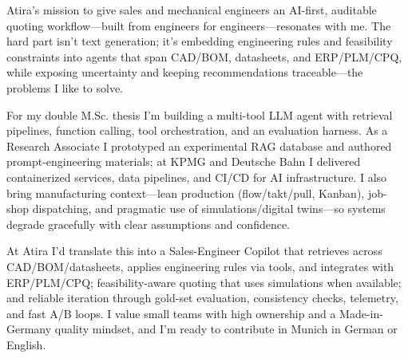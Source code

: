 Atira’s mission to give sales and mechanical engineers an AI-first, auditable quoting workflow—built from engineers for engineers—resonates with me. The hard part isn’t text generation; it’s embedding engineering rules and feasibility constraints into agents that span CAD/BOM, datasheets, and ERP/PLM/CPQ, while exposing uncertainty and keeping recommendations traceable—the problems I like to solve.

For my double M.Sc. thesis I’m building a multi-tool LLM agent with retrieval pipelines, function calling, tool orchestration, and an evaluation harness. As a Research Associate I prototyped an experimental RAG database and authored prompt-engineering materials; at KPMG and Deutsche Bahn I delivered containerized services, data pipelines, and CI/CD for AI infrastructure. I also bring manufacturing context—lean production (flow/takt/pull, Kanban), job-shop dispatching, and pragmatic use of simulations/digital twins—so systems degrade gracefully with clear assumptions and confidence.

At Atira I’d translate this into a Sales-Engineer Copilot that retrieves across CAD/BOM/datasheets, applies engineering rules via tools, and integrates with ERP/PLM/CPQ; feasibility-aware quoting that uses simulations when available; and reliable iteration through gold-set evaluation, consistency checks, telemetry, and fast A/B loops. I value small teams with high ownership and a Made-in-Germany quality mindset, and I’m ready to contribute in Munich in German or English.